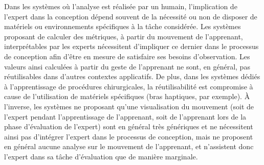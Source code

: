 Dans les systèmes où l'analyse est réalisée par un humain, l'implication de l'expert dans la conception dépend souvent de la nécessité ou non de disposer de matériels ou environnements spécifiques à la tâche considérée. Les systèmes proposant de calculer des métriques, à partir du mouvement de l'apprenant, interprétables par les experts nécessitent d'impliquer ce dernier dans le processus de conception afin d'être en mesure de satisfaire ses besoins d'observation. Les valeurs ainsi calculées à partir du geste de l'apprenant ne sont, en général, pas réutilisables dans d'autres contextes applicatifs. De plus, dans les systèmes dédiés à l'apprentissage de procédures chirurgicales, la réutilisabilité est compromise à cause de l'utilisation de matériels spécifiques (bras haptiques, par exemple). À l'inverse, les systèmes ne proposant qu'une visualisation du mouvement (soit de l'expert pendant l'apprentissage de l'apprenant, soit de l'apprenant lors de la phase d'évaluation de l'expert) sont en général très génériques et ne nécessitent ainsi pas d'intégrer l'expert dans le processus de conception, mais ne proposent en général aucune analyse sur le mouvement de l'apprenant, et n'assistent donc l'expert dans sa tâche d'évaluation que de manière marginale.


